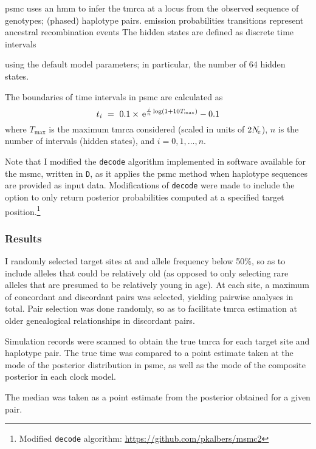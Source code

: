 \Gls{psmc} uses an \gls{hmm} to infer the \gls{tmrca} at a locus from the observed sequence of genotypes; \ie (phased) haplotype pairs.
emission probabilities
transitions represent ancestral recombination events
The hidden states are defined as discrete time intervals



using the default model parameters; in particular, the number of 64 hidden states.

The boundaries of time intervals in \gls{psmc} are calculated as
\begin{equation*}
	t_i ~=~ 0.1 \times \,\mathrm{e}^{\frac{i}{n}\log(1 + 10  T_{\max})} - 0.1
\end{equation*}
where $T_{\max}$ is the maximum \gls{tmrca} considered (scaled in units of $2N_{\!e}$), $n$ is the number of intervals (\ie hidden states), and ${i=0,1,\ldots,n}$.

Note that I modified the \texttt{decode} algorithm implemented in software available for the \gls{msmc}, written in \texttt{D}, as it applies the \gls{psmc} method when  haplotype sequences are provided as input data.
Modifications of \texttt{decode} were made to include the option to only return posterior probabilities computed at a specified target position.\footnote{Modified \texttt{decode} algorithm: \url{https://github.com/pkalbers/msmc2} }


%
\subsubsection{Results}
%

I randomly selected  target sites at  and allele frequency below 50\%, so as to include alleles that could be relatively old (as opposed to only selecting rare alleles that are presumed to be relatively young in age).
At each site, a maximum of  concordant and  discordant pairs was selected, yielding  pairwise analyses in total.
Pair selection was done randomly, so as to facilitate \gls{tmrca} estimation at older genealogical relationships in discordant pairs.


Simulation records were scanned to obtain the true \gls{tmrca} for each target site and haplotype pair.
The true time was compared to a point estimate taken at the mode of the posterior distribution in \gls{psmc},
as well as the mode of the composite posterior in each clock model.


The median was taken as a point estimate from the posterior obtained for a given pair.





